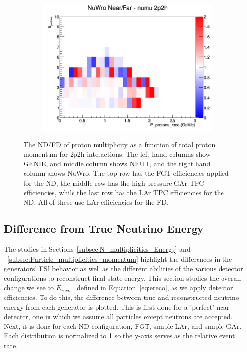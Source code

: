 \documentclass[12pt]{article}
\begin{document}
\begin{figure}[h]
\begin{subfigure}[b]{0.32\textwidth}
\includegraphics[width=\linewidth]{eff_N_P/LAr/protons/ratios/2p2h_NuWro_numu_NF_N_P.png}
\end{subfigure}
\caption{The ND/FD of proton multiplicity as a function of total proton momentum for 2p2h interactions. The left hand columns show GENIE, and middle column shows NEUT, and the right hand column shows NuWro. The top row has the FGT efficiencies applied for the ND, the middle row has the high pressure GAr TPC efficiencies, while the last row has the LAr TPC efficiencies for the ND.  All of these use LAr efficiencies for the FD.}
\label{fig:proton_multiplicity_2p2h_NF_eff}
\end{figure}


\subsection{Difference from True Neutrino Energy}
\label{subsec:EDiff}
The studies in Sections~\ref{subsec:N_multiplicities_Energy} and ~\ref{subsec:Particle_multiplicities_momentum} highlight the differences in the generators' FSI behavior as well as the different abilities of the various detector configurations to reconstruct final state energy. This section studies the overall change we see to $E_{reco}$ , defined in Equation~\ref{eq:ereco}, as we apply detector efficiencies. To do this, the difference between true and reconstructed neutrino energy from each generator is plotted. This is first done for a 'perfect' near detector, one in which we assume all particles except neutrons are accepted. Next, it is done for each ND configuration, FGT, simple LAr, and simple GAr. %
Each distribution is normalized to 1 so the y-axis serves as the relative event rate. 
\end{document}
